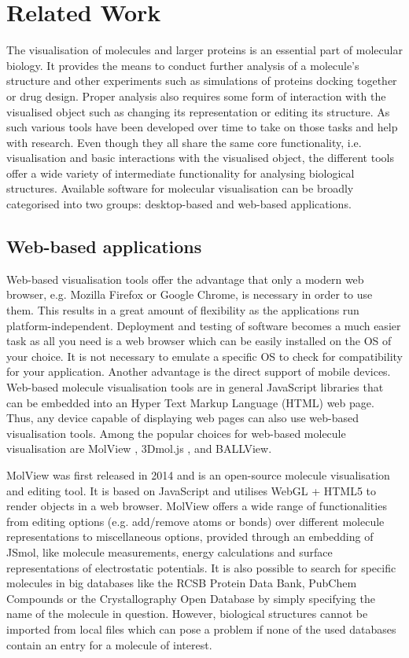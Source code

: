 %
\chapter{Related Work}
\label{sec:related}

The visualisation of molecules and larger proteins is an essential part of molecular biology. It provides the means to conduct further analysis of a molecule's structure and other experiments such as simulations of proteins docking together or drug design. Proper analysis also requires some form of interaction with the visualised object such as changing its representation or editing its structure. As such various tools have been developed over time to take on those tasks and help with research. Even though they all share the same core functionality, i.e. visualisation and basic interactions with the visualised object, the different tools offer a wide variety of intermediate functionality for analysing biological structures. Available software for molecular visualisation can be broadly categorised into two groups: desktop-based and web-based applications. 


\section{Web-based applications}
\label{sec:related:web}

Web-based visualisation tools offer the advantage that only a modern web browser, e.g. Mozilla Firefox or Google Chrome, is necessary in order to use them. This results in a great amount of flexibility as the applications run platform-independent. Deployment and testing of software becomes a much easier task as all you need is a web browser which can be easily installed on the OS of your choice. It is not necessary to emulate a specific OS to check for compatibility for your application. Another advantage is the direct support of mobile devices. Web-based molecule visualisation tools are in general JavaScript libraries that can be embedded into an Hyper Text Markup Language (HTML) web page. Thus, any device capable of displaying web pages can also use web-based visualisation tools. Among the popular choices for web-based molecule visualisation are MolView \cite{Bergwerf2022Oct}, 3Dmol.js \cite{10.1093/bioinformatics/btu829}, and BALLView.

MolView was first released in 2014 and is an open-source molecule visualisation and editing tool. It is based on JavaScript and utilises WebGL + HTML5 to render objects in a web browser. MolView offers a wide range of functionalities from editing options (e.g. add/remove atoms or bonds) over different molecule representations to miscellaneous options, provided through an embedding of JSmol, like molecule measurements, energy calculations and surface representations of electrostatic potentials. It is also possible to search for specific molecules in big databases like the RCSB Protein Data Bank, PubChem Compounds or the Crystallography Open Database by simply specifying the name of the molecule in question. However, biological structures cannot be imported from local files which can pose a problem if none of the used databases contain an entry for a molecule of interest. 

